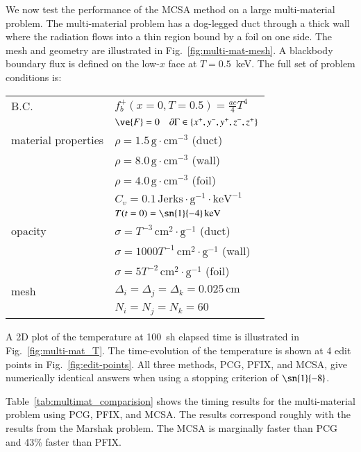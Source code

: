 \documentclass[preprint,12pt]{elsarticle}
\newcommand{\Cv}{\ensuremath{C_{v}}}
\newcommand{\Di}{\ensuremath{\Delta_i}}
\newcommand{\Dj}{\ensuremath{\Delta_j}}
\newcommand{\Dk}{\ensuremath{\Delta_k}}
\begin{document}
We now test the performance of the MCSA method on a large
multi-material problem.  The multi-material problem has a dog-legged
duct through a thick wall where the radiation flows into a thin region
bound by a foil on one side.  The mesh and geometry are illustrated in
Fig.~\ref{fig:multi-mat-mesh}.  A blackbody boundary flux is defined
on the low-$x$ face at $T=0.5$~keV.  The full set of problem
conditions is:
\begin{center}
  \begin{tabular}{ll}\hline
    B.C. & $f_b^{+}(x=0,T=0.5) = \frac{ac}{4}T^4$\\
    & $\ve{F} = 0\quad \partial\Gamma \in \{x^{+}, y^{-}, y^{+},
    z^{-}, z^{+}\}$ \\
    material properties 
    & $\rho = 1.5\,\text{g}\cdot\text{cm}^{-3}$ (duct) \\
    & $\rho = 8.0\,\text{g}\cdot\text{cm}^{-3}$ (wall) \\
    & $\rho = 4.0\,\text{g}\cdot\text{cm}^{-3}$ (foil) \\
    & $\Cv = 0.1\,\text{Jerks}\cdot\text{g}^{-1}\cdot\text{keV}^{-1}$\\
    & $T(t=0) = \sn{1}{-4}\,\text{keV}$\\
    opacity 
    & $\sigma = T^{-3}\,\text{cm}^2\cdot\text{g}^{-1}$ (duct) \\
    & $\sigma = 1000T^{-1}\,\text{cm}^2\cdot\text{g}^{-1}$ (wall) \\
    & $\sigma = 5T^{-2}\,\text{cm}^2\cdot\text{g}^{-1}$ (foil) \\
    mesh & $\Di = \Dj = \Dk = 0.025\,\text{cm}$ \\
    & $N_i =  N_j = N_k = 60$ \\
    \hline
  \end{tabular}
\end{center}
A 2D plot of the temperature at 100~sh elapsed time is illustrated in
Fig.~\ref{fig:multi-mat_T}.  The time-evolution of the temperature is
shown at 4 edit points in Fig.~\ref{fig:edit-points}.  All three
methods, PCG, PFIX, and MCSA, give numerically identical answers when
using a stopping criterion of $\sn{1}{-8}$.

Table~\ref{tab:multimat_comparision} shows the timing results for the
multi-material problem using PCG, PFIX, and MCSA.  The results
correspond roughly with the results from the Marshak problem.  The
MCSA is marginally faster than PCG and 43\% faster than PFIX.

\end{document}
